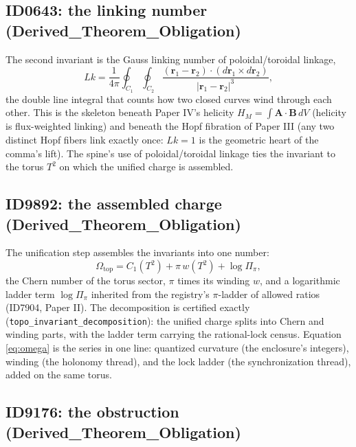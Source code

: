 \documentclass[11pt]{article}
\theoremstyle{remark}
\begin{document}
\subsection{ID0643: the linking number (Derived\_Theorem\_Obligation)}

The second invariant is the Gauss linking number of poloidal/toroidal linkage,
\begin{equation}
Lk = \frac{1}{4\pi} \oint_{C_1} \oint_{C_2} \frac{(\mathbf{r}_1 - \mathbf{r}_2) \cdot (d\mathbf{r}_1 \times d\mathbf{r}_2)}{|\mathbf{r}_1 - \mathbf{r}_2|^3},
\label{eq:linking}
\end{equation}
the double line integral that counts how two closed curves wind through each other. This is the skeleton beneath Paper IV's helicity $H_M = \int \mathbf{A} \cdot \mathbf{B}\, dV$ (helicity is flux-weighted linking) and beneath the Hopf fibration of Paper III (any two distinct Hopf fibers link exactly once: $Lk = 1$ is the geometric heart of the comma's lift). The spine's use of poloidal/toroidal linkage ties the invariant to the torus $T^2$ on which the unified charge is assembled.

\subsection{ID9892: the assembled charge (Derived\_Theorem\_Obligation)}

The unification step assembles the invariants into one number:
\begin{equation}
\Omega_{\mathrm{top}} = C_1(T^2) + \pi\, w(T^2) + \log \Pi_\pi,
\label{eq:omega}
\end{equation}
the Chern number of the torus sector, $\pi$ times its winding $w$, and a logarithmic ladder term $\log \Pi_\pi$ inherited from the registry's $\pi$-ladder of allowed ratios (ID7904, Paper II). The decomposition is certified exactly (\texttt{topo\_invariant\_decomposition}): the unified charge splits into Chern and winding parts, with the ladder term carrying the rational-lock census. Equation \eqref{eq:omega} is the series in one line: quantized curvature (the enclosure's integers), winding (the holonomy thread), and the lock ladder (the synchronization thread), added on the same torus.

\subsection{ID9176: the obstruction (Derived\_Theorem\_Obligation)}
\end{document}
